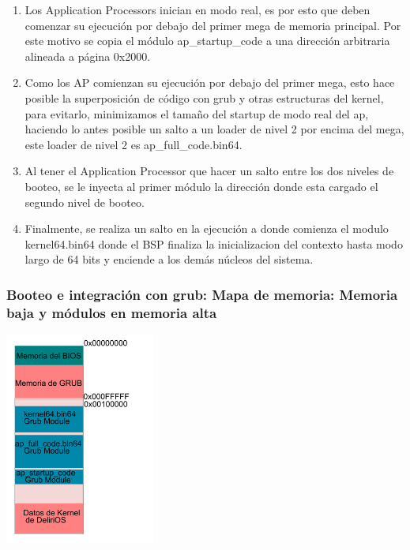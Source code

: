 \begin{itemize}
\begin{enumerate}
\begin{enumerate}
					\item Los Application Processors inician en modo real, es por esto que deben comenzar su ejecución por debajo del primer mega de memoria principal. Por este motivo se copia el módulo ap\_startup\_code a una dirección arbitraria alineada a página 0x2000.
					\vspace{0.1cm}
					\item Como los AP comienzan su ejecución por debajo del primer mega, esto hace posible la superposición de código con grub y otras estructuras del kernel, para evitarlo, minimizamos el tamaño del startup de modo real del ap, haciendo lo antes posible un salto a un loader de nivel 2 por encima del mega, este loader de nivel 2 es ap\_full\_code.bin64.
					\vspace{0.1cm}
					\item Al tener el Application Processor que hacer un salto entre los dos niveles de booteo, se le inyecta al primer módulo la dirección donde esta cargado el segundo nivel de booteo.
					\vspace{0.1cm}
					\item Finalmente, se realiza un salto en la ejecución a donde comienza el modulo kernel64.bin64 donde el BSP finaliza la inicializacion del contexto hasta modo largo de 64 bits y enciende a los demás núcleos del sistema.
				\end{enumerate}
			\end{enumerate}
	\end{itemize}

	\subsubsection{Booteo e integración con grub: Mapa de memoria: Memoria baja y módulos en memoria alta}

	\begin{center}
		\includegraphics[height=7cm]{images/modules-map.pdf} 
	\end{center}
